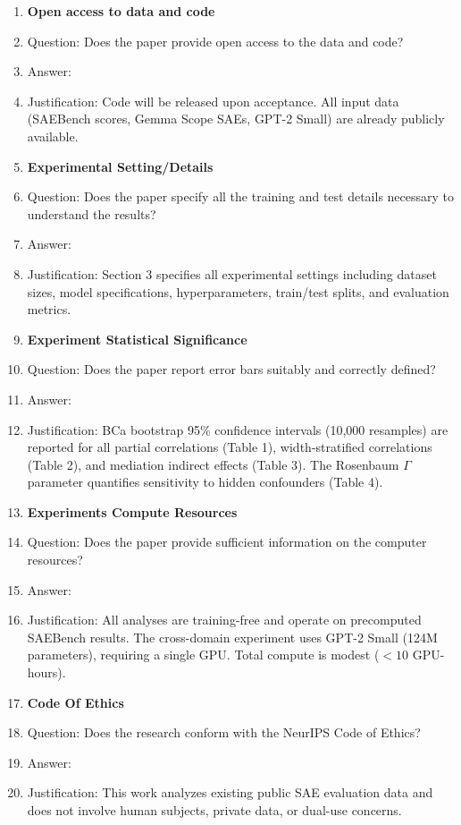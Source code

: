 \documentclass{article}
\begin{document}
\begin{enumerate}
\item {\bf Open access to data and code}
    \item[] Question: Does the paper provide open access to the data and code?
    \item[] Answer: \answerNo{}
    \item[] Justification: Code will be released upon acceptance. All input data (SAEBench scores, Gemma Scope SAEs, GPT-2 Small) are already publicly available.

\item {\bf Experimental Setting/Details}
    \item[] Question: Does the paper specify all the training and test details necessary to understand the results?
    \item[] Answer: \answerYes{}
    \item[] Justification: Section 3 specifies all experimental settings including dataset sizes, model specifications, hyperparameters, train/test splits, and evaluation metrics.

\item {\bf Experiment Statistical Significance}
    \item[] Question: Does the paper report error bars suitably and correctly defined?
    \item[] Answer: \answerYes{}
    \item[] Justification: BCa bootstrap 95\% confidence intervals (10,000 resamples) are reported for all partial correlations (Table 1), width-stratified correlations (Table 2), and mediation indirect effects (Table 3). The Rosenbaum $\Gamma$ parameter quantifies sensitivity to hidden confounders (Table 4).

\item {\bf Experiments Compute Resources}
    \item[] Question: Does the paper provide sufficient information on the computer resources?
    \item[] Answer: \answerYes{}
    \item[] Justification: All analyses are training-free and operate on precomputed SAEBench results. The cross-domain experiment uses GPT-2 Small (124M parameters), requiring a single GPU. Total compute is modest ($< 10$ GPU-hours).

\item {\bf Code Of Ethics}
    \item[] Question: Does the research conform with the NeurIPS Code of Ethics?
    \item[] Answer: \answerYes{}
    \item[] Justification: This work analyzes existing public SAE evaluation data and does not involve human subjects, private data, or dual-use concerns.


\end{enumerate}
\end{document}
